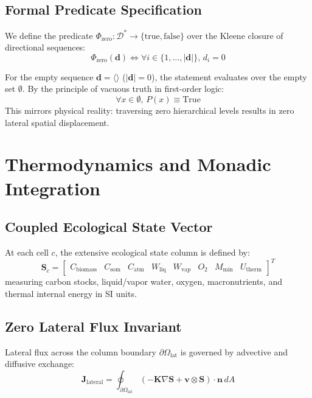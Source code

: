 \documentclass[10pt,journal,compsoc]{IEEEtran}
\begin{document}
\subsection{Formal Predicate Specification}
We define the predicate $\Phi_{\text{zero}}: \mathcal{D}^* \to \{\text{true}, \text{false}\}$ over the Kleene closure of directional sequences:
\begin{equation}
\Phi_{\text{zero}}(\mathbf{d}) \iff \forall i \in \{1, \dots, |\mathbf{d}|\}, \, d_i = 0
\end{equation}

For the empty sequence $\mathbf{d} = \langle \rangle$ ($|\mathbf{d}| = 0$), the statement evaluates over the empty set $\emptyset$. By the principle of vacuous truth in first-order logic:
\begin{equation}
\forall x \in \emptyset, \, P(x) \equiv \text{True}
\end{equation}
This mirrors physical reality: traversing zero hierarchical levels results in zero lateral spatial displacement.

\section{Thermodynamics and Monadic Integration}

\subsection{Coupled Ecological State Vector}
At each cell $c$, the extensive ecological state column is defined by:
\begin{equation}
\mathbf{S}_c = \begin{bmatrix}
C_{\text{biomass}} & C_{\text{som}} & C_{\text{atm}} & W_{\text{liq}} & W_{\text{vap}} & O_2 & M_{\text{min}} & U_{\text{therm}}
\end{bmatrix}^T
\end{equation}
measuring carbon stocks, liquid/vapor water, oxygen, macronutrients, and thermal internal energy in SI units.

\subsection{Zero Lateral Flux Invariant}
Lateral flux across the column boundary $\partial \Omega_{\text{lat}}$ is governed by advective and diffusive exchange:
\begin{equation}
\mathbf{J}_{\text{lateral}} = \oint_{\partial \Omega_{\text{lat}}} \left( - \mathbf{K} \nabla \mathbf{S} + \mathbf{v} \otimes \mathbf{S} \right) \cdot \mathbf{n} \, dA
\end{equation}
\end{document}
